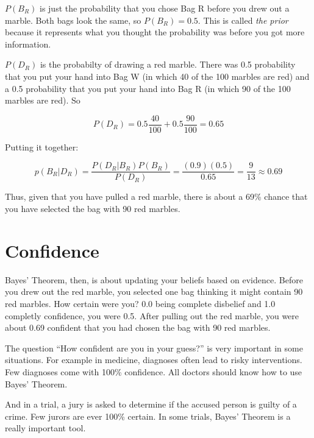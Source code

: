 $P(B_R)$ is just the probability that you chose Bag R before you drew
out a marble. Both bags look the same, so $P(B_R)= 0.5$. This is
called \textit{the prior} because it represents what you thought the
probability was before you got more information.

$P(D_R)$ is the probabilty of drawing a red marble. There was 0.5
probability that you put your hand into Bag W (in which 40 of the 100
marbles are red) and a 0.5 probability that you put your hand into Bag
R (in which 90 of the 100 marbles are red).  So

$$P(D_R) = 0.5 \frac{40}{100} + 0.5 \frac{90}{100} = 0.65$$

Putting it together:

$$p(B_R | D_R) = \frac{ P(D_R | B_R) P(B_R) } {P(D_R)} = \frac{(0.9)(0.5)}{0.65} = \frac{9}{13} \approx 0.69$$

Thus, given that you have pulled a red marble, there is about a 69\% chance
that you have selected the bag with 90 red marbles.

\section{Confidence}

Bayes' Theorem, then, is about updating your beliefs based on
evidence.  Before you drew out the red marble, you selected one bag
thinking it might contain 90 red marbles. How certain were you? 0.0 being complete disbelief and 1.0 completly
confidence, you were 0.5. After pulling out the red marble, you were about 0.69
confident that you had chosen the bag with 90 red marbles.

The question ``How confident are you in your guess?'' is very
important in some situations. For example in medicine, diagnoses often
lead to risky interventions. Few diagnoses come with 100\% confidence.
All doctors should know how to use Bayes' Theorem. 

And in a trial, a jury is asked to determine if the accused person is
guilty of a crime. Few jurors are ever 100\% certain. In some trials, Bayes'
Theorem is a really important tool.

